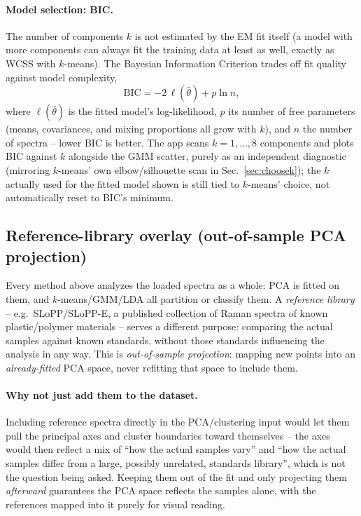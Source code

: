 \documentclass[11pt,a4paper]{article}
\begin{document}
\paragraph{Model selection: BIC.} The number of components $k$ is not
estimated by the EM fit itself (a model with more components can always
fit the training data at least as well, exactly as WCSS with $k$-means).
The Bayesian Information Criterion trades off fit quality against model
complexity,
\[
  \mathrm{BIC} = -2\,\ell(\hat\theta) + p \ln n ,
\]
where $\ell(\hat\theta)$ is the fitted model's log-likelihood, $p$ its
number of free parameters (means, covariances, and mixing proportions all
grow with $k$), and $n$ the number of spectra -- lower BIC is better. The
app scans $k=1,\dots,8$ components and plots BIC against $k$ alongside the
GMM scatter, purely as an independent diagnostic (mirroring $k$-means' own
elbow/silhouette scan in Sec.~\ref{sec:choosek}); the $k$ actually used for
the fitted model shown is still tied to $k$-means' choice, not
automatically reset to BIC's minimum.

\subsection{Reference-library overlay (out-of-sample PCA projection)}
\label{sec:references}
Every method above analyzes the loaded spectra as a whole: PCA is fitted on
them, and $k$-means/GMM/LDA all partition or classify them. A
\emph{reference library} -- e.g.\ SLoPP/SLoPP-E, a published collection of
Raman spectra of known plastic/polymer materials \cite{Munno2020} -- serves
a different purpose: comparing the actual samples against known standards,
without those standards influencing the analysis in any way. This is
\emph{out-of-sample projection}: mapping new points into an
\emph{already-fitted} PCA space, never refitting that space to include them.

\paragraph{Why not just add them to the dataset.} Including reference
spectra directly in the PCA/clustering input would let them pull the
principal axes and cluster boundaries toward themselves -- the axes would
then reflect a mix of ``how the actual samples vary'' and ``how the actual
samples differ from a large, possibly unrelated, standards library'',
which is not the question being asked. Keeping them out of the fit and
only projecting them \emph{afterward} guarantees the PCA space reflects
the samples alone, with the references mapped into it purely for visual
reading.
\end{document}
